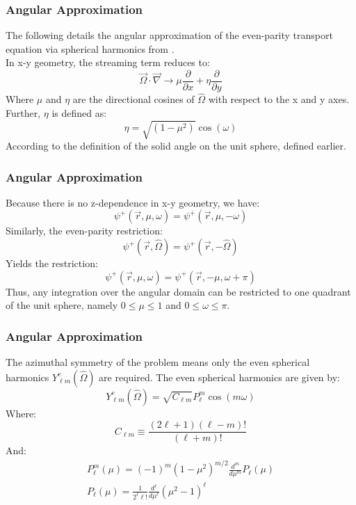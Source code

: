 \begin{frame}
  \frametitle{Angular Approximation}
  The following details the angular approximation of the even-parity transport equation via spherical harmonics from \cite{lewisComputationalMethodsNeutron1993}. \\
  In x-y geometry, the streaming term reduces to:
  \begin{equation}
    \vec{\Omega}\cdot\vec{\nabla}\rightarrow\mu\frac{\partial}{\partial x}+\eta\frac{\partial}{\partial y}
  \end{equation}
  Where $\mu$ and $\eta$ are the directional cosines of $\hat{\Omega}$ with respect to the x and y axes. \\
  Further, $\eta$ is defined as:
  \begin{equation}
    \eta=\sqrt{(1-\mu^2)}\cos(\omega)
  \end{equation}
  According to the definition of the solid angle on the unit sphere, defined earlier. \\
\end{frame}

\begin{frame}
  \frametitle{Angular Approximation}
  Because there is no z-dependence in x-y geometry, we have:
  \begin{equation}
    \psi^+(\vec{r},\mu,\omega)=\psi^+(\vec{r},\mu,-\omega)
  \end{equation}
  Similarly, the even-parity restriction:
  \begin{equation}
    \psi^+(\vec{r},\hat{\Omega})=\psi^+(\vec{r},-\hat{\Omega})
  \end{equation}
  Yields the restriction:
  \begin{equation}
    \psi^+(\vec{r},\mu,\omega)=\psi^+(\vec{r},-\mu,\omega+\pi)
  \end{equation}
  Thus, any integration over the angular domain can be restricted to one quadrant of the unit sphere, namely
  $0\leq\mu\leq1$ and $0\leq\omega\leq\pi$.
\end{frame}

\begin{frame}
  \frametitle{Angular Approximation}
  The azimuthal symmetry of the problem means only the even spherical harmonics $Y_{\ell m}^e(\hat{\Omega})$ are required.
  The even spherical harmonics are given by:
  \begin{equation}
    Y_{\ell m}^e(\hat{\Omega})=\sqrt{C_{\ell m}}P_{\ell}^m\cos(m\omega)
  \end{equation}
  Where:
  \begin{equation}
    C_{\ell m}\equiv\frac{(2\ell+1)(\ell-m)!}{(\ell+m)!}
  \end{equation}
  And:
  \begin{align}
    P_{\ell}^m(\mu)=(-1)^m(1-\mu^2)^{m/2}\frac{d^m}{d\mu^m}P_{\ell}(\mu) \\
    P_{\ell}(\mu)=\frac{1}{2^{\ell}\ell!}\frac{d^{\ell}}{d\mu^{\ell}}(\mu^2-1)^{\ell}
  \end{align}
\end{frame}

